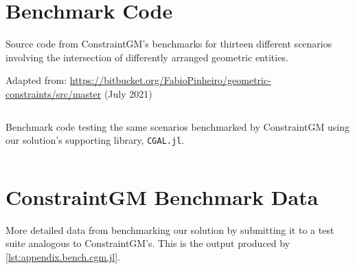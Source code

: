\chapter{Benchmark Code}%
\label{chap:appendix.bench}

\begin{listingx}
  \caption[ConstraintGM Racket benchmark code]{
    Source code from ConstraintGM's benchmarks for thirteen different scenarios
    involving the intersection of differently arranged geometric
    entities.}%
  \label{lst:appendix.bench.cgm.rkt}
  \smallskip
  {\scriptsize Adapted from:
  \url{https://bitbucket.org/FabioPinheiro/geometric-constraints/src/master}
  (July 2021)}
  \vspace{-12pt}
  \inputminted[breaklines]{racket}{rkt/bench-cgm.rkt}
\end{listingx}

\begin{listing}[H]
  \caption[\texttt{CGAL.jl} Julia benchmark code]{
    Benchmark code testing the same scenarios benchmarked by ConstraintGM using
    our solution's supporting library,
    \texttt{CGAL.jl}.}%
  \label{lst:appendix.bench.cgm.jl}
  \inputminted{julia}{jl/bench_cgm.jl}
\end{listing}

\chapter{ConstraintGM Benchmark Data}%
\label{chap:appendix.cgmdata}

\begin{listingx}
  \caption[ConstraintGM's raw benchmark data]{\label{lst:appendix.cgmdata.rkt}%
    Data produced through the execution of the code in
    \cref{lst:appendix.bench.cgm.rkt} a total of nine times to obtain a slightly
    larger sample
  }
  \medskip
  
\end{listingx}

\begin{listingx}
\caption[Our solution's ConstraintGM benchmark data]{
  More detailed data from benchmarking our solution by submitting it to a test
  suite analogous to ConstraintGM's.  This is the output produced by
  \cref{lst:appendix.bench.cgm.jl}.}\label{lst:appendix.cgmdata.jl}
\medskip
\footnotesize

\end{listingx}
